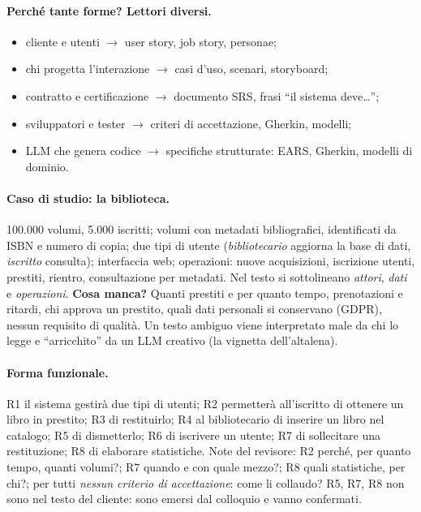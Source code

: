 \documentclass[a4paper,12pt]{article}
\begin{document}
\paragraph{Perché tante forme? Lettori diversi.}
\begin{itemize}[nosep]
  \item cliente e utenti $\to$ user story, job story, personae;
  \item chi progetta l'interazione $\to$ casi d'uso, scenari, storyboard;
  \item contratto e certificazione $\to$ documento SRS, frasi ``il sistema deve\dots'';
  \item sviluppatori e tester $\to$ criteri di accettazione, Gherkin, modelli;
  \item LLM che genera codice $\to$ specifiche strutturate: EARS, Gherkin, modelli di dominio.
\end{itemize}

\paragraph{Caso di studio: la biblioteca.} 100.000 volumi, 5.000 iscritti; volumi con
metadati bibliografici, identificati da ISBN e numero di copia; due tipi di utente
(\emph{bibliotecario} aggiorna la base di dati, \emph{iscritto} consulta); interfaccia web;
operazioni: nuove acquisizioni, iscrizione utenti, prestiti, rientro, consultazione per
metadati. Nel testo si sottolineano \emph{attori}, \emph{dati} e \emph{operazioni}.
\textbf{Cosa manca?} Quanti prestiti e per quanto tempo, prenotazioni e ritardi, chi approva
un prestito, quali dati personali si conservano (GDPR), nessun requisito di qualità. Un testo
ambiguo viene interpretato male da chi lo legge e ``arricchito'' da un LLM creativo (la
vignetta dell'altalena).

\paragraph{Forma funzionale.} R1 il sistema gestirà due tipi di utenti; R2 permetterà
all'iscritto di ottenere un libro in prestito; R3 di restituirlo; R4 al bibliotecario di
inserire un libro nel catalogo; R5 di dismetterlo; R6 di iscrivere un utente; R7 di
sollecitare una restituzione; R8 di elaborare statistiche. Note del revisore: R2 perché, per
quanto tempo, quanti volumi?; R7 quando e con quale mezzo?; R8 quali statistiche, per chi?;
per tutti \emph{nessun criterio di accettazione}: come li collaudo? R5, R7, R8 non sono nel
testo del cliente: sono emersi dal colloquio e vanno confermati.
\end{document}
